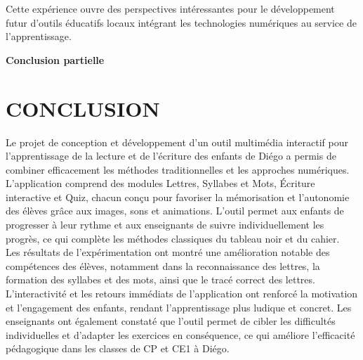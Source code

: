 \documentclass[a4paper,oneside,12pt]{book}
\begin{document}
Cette expérience ouvre des perspectives intéressantes pour le développement futur d'outils éducatifs locaux intégrant les technologies numériques au service de l'apprentissage.

 


\textbf{Conclusion partielle}\\





  
 
 









































 
 

\chapter*{CONCLUSION }\label{chap3}

Le projet de conception et développement d'un outil multimédia interactif pour l'apprentissage de la lecture et de l'écriture des enfants de Diégo a permis de combiner efficacement les méthodes traditionnelles et les approches numériques. L'application comprend des modules Lettres, Syllabes et Mots, Écriture interactive et Quiz, chacun conçu pour favoriser la mémorisation et l'autonomie des élèves grâce aux images, sons et animations. L'outil permet aux enfants de progresser à leur rythme et aux enseignants de suivre individuellement les progrès, ce qui complète les méthodes classiques du tableau noir et du cahier.\\

Les résultats de l'expérimentation ont montré une amélioration notable des compétences des élèves, notamment dans la reconnaissance des lettres, la formation des syllabes et des mots, ainsi que le tracé correct des lettres. L'interactivité et les retours immédiats de l'application ont renforcé la motivation et l'engagement des enfants, rendant l'apprentissage plus ludique et concret. Les enseignants ont également constaté que l'outil permet de cibler les difficultés individuelles et d'adapter les exercices en conséquence, ce qui améliore l'efficacité pédagogique dans les classes de CP et CE1 à Diégo.\\
\end{document}
